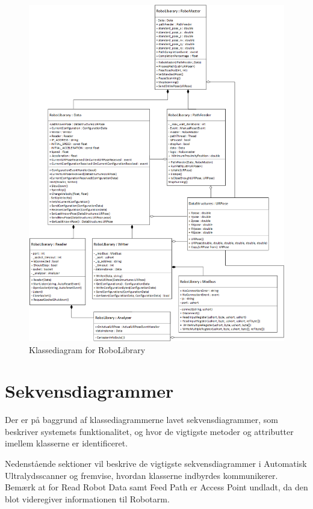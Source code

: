 \begin{figure}[H]
    \centering
    \includegraphics[width=1\textwidth]{figurer/d/Design/Class/uml_class_robolibrary}
    \caption{Klassediagram for RoboLibrary}
    \label{class_RoboLib}
\end{figure}
\newpage

\section{Sekvensdiagrammer}
Der er på baggrund af klassediagrammerne lavet sekvensdiagrammer, som beskriver systemets funktionalitet, og hvor de vigtigste metoder og attributter imellem klasserne er identificeret.

Nedenstående sektioner vil beskrive de vigtigste sekvensdiagrammer i Automatisk Ultralydsscanner og fremvise, hvordan klasserne indbyrdes kommunikerer. 
Bemærk at for Read Robot Data samt Feed Path er Access Point undladt, da den blot videregiver informationen til Robotarm.

